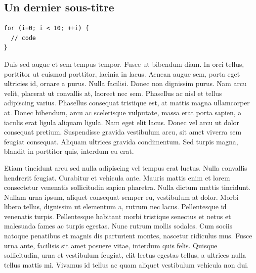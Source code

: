 \subsection{Un dernier sous-titre}

\begin{lstlisting}[caption=Exemple de code]
for (i=0; i < 10; ++i) {
  // code
}
\end{lstlisting}

Duis sed augue et sem tempus tempor. Fusce ut bibendum diam. In orci tellus,
porttitor ut euismod porttitor, lacinia in lacus. Aenean augue sem, porta
eget ultricies id, ornare a purus. Nulla facilisi. Donec non dignissim
purus. Nam arcu velit, placerat ut convallis at, laoreet nec sem. Phasellus
ac nisl et tellus adipiscing varius. Phasellus consequat tristique est, at
mattis magna ullamcorper at. Donec bibendum, arcu ac scelerisque vulputate,
massa erat porta sapien, a iaculis erat ligula aliquam ligula. Nam eget elit
lacus. Donec vel arcu ut dolor consequat pretium. Suspendisse gravida
vestibulum arcu, sit amet viverra sem feugiat consequat. Aliquam ultrices
gravida condimentum. Sed turpis magna, blandit in porttitor quis, interdum
eu erat.

Etiam tincidunt arcu sed nulla adipiscing vel tempus erat luctus. Nulla
convallis hendrerit feugiat. Curabitur et vehicula ante. Mauris mattis enim
et lorem consectetur venenatis sollicitudin sapien pharetra. Nulla dictum
mattis tincidunt. Nullam urna ipsum, aliquet consequat semper eu, vestibulum
at dolor. Morbi libero tellus, dignissim ut elementum a, rutrum nec lacus.
Pellentesque id venenatis turpis. Pellentesque habitant morbi tristique
senectus et netus et malesuada fames ac turpis egestas. Nunc rutrum mollis
sodales. Cum sociis natoque penatibus et magnis dis parturient montes,
nascetur ridiculus mus. Fusce urna ante, facilisis sit amet posuere vitae,
interdum quis felis. Quisque sollicitudin, urna et vestibulum feugiat, elit
lectus egestas tellus, a ultrices nulla tellus mattis mi. Vivamus id tellus
ac quam aliquet vestibulum vehicula non dui.
